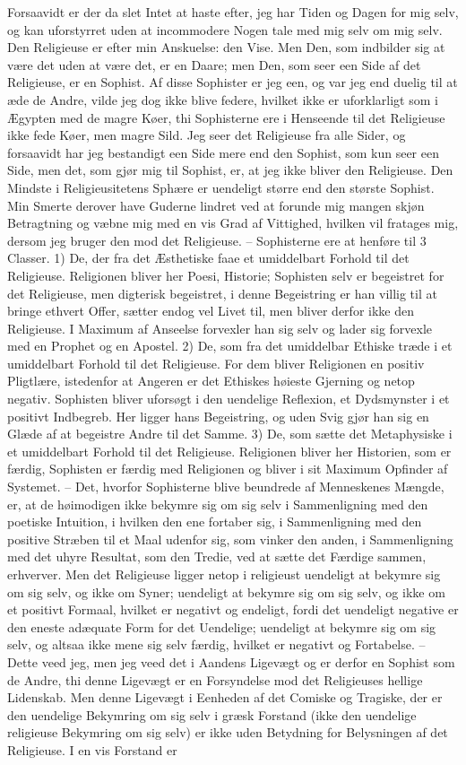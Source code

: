 \documentclass[12pt,a4paper]{article}
\begin{document}
Forsaavidt er der da slet Intet at haste efter, jeg har Tiden og Dagen for mig selv, og kan uforstyrret uden at incommodere Nogen tale med mig selv om mig selv. Den Religieuse er efter min Anskuelse: den Vise. Men Den, som indbilder sig at være det uden at være det, er en Daare; men Den, som seer een Side af det Religieuse, er en Sophist. Af disse Sophister er jeg een, og var jeg end duelig til at æde de Andre, vilde jeg dog ikke blive federe, hvilket ikke er uforklarligt som i Ægypten med de magre Køer, thi Sophisterne ere i Henseende til det Religieuse ikke fede Køer, men magre Sild. Jeg seer det Religieuse fra alle Sider, og forsaavidt har jeg bestandigt een Side mere end den Sophist, som kun seer een Side, men det, som gjør mig til Sophist, er, at jeg ikke bliver den Religieuse. Den Mindste i Religieusitetens Sphære er uendeligt større end den største Sophist. Min Smerte derover have Guderne lindret ved at forunde mig mangen skjøn Betragtning og væbne mig med en vis Grad af Vittighed, hvilken vil fratages mig, dersom jeg bruger den mod det Religieuse. – Sophisterne ere at henføre til 3 Classer. 1) De, der fra det Æsthetiske faae et umiddelbart Forhold til det Religieuse. Religionen bliver her Poesi, Historie; Sophisten selv er begeistret for det Religieuse, men digterisk begeistret, i denne Begeistring er han villig til at bringe ethvert Offer, sætter endog vel Livet til, men bliver derfor ikke den Religieuse. I Maximum af Anseelse forvexler han sig selv og lader sig forvexle med en Prophet og en Apostel. 2) De, som fra det umiddelbar Ethiske træde i et umiddelbart Forhold til det Religieuse. For dem bliver Religionen en positiv Pligtlære, istedenfor at Angeren er det Ethiskes høieste Gjerning og netop negativ. Sophisten bliver uforsøgt i den uendelige Reflexion, et Dydsmynster i et positivt Indbegreb. Her ligger hans Begeistring, og uden Svig gjør han sig en Glæde af at begeistre Andre til det Samme. 3) De, som sætte det Metaphysiske i et umiddelbart Forhold til det Religieuse. Religionen bliver her Historien, som er færdig, Sophisten er færdig med Religionen og bliver i sit Maximum Opfinder af Systemet. – Det, hvorfor Sophisterne blive beundrede af Menneskenes Mængde, er, at de høimodigen ikke bekymre sig om sig selv i Sammenligning med den poetiske Intuition, i hvilken den ene fortaber sig, i Sammenligning med den positive Stræben til et Maal udenfor sig, som vinker den anden, i Sammenligning med det uhyre Resultat, som den Tredie, ved at sætte det Færdige sammen, erhverver. Men det Religieuse ligger netop i religieust uendeligt at bekymre sig om sig selv, og ikke om Syner; uendeligt at bekymre sig om sig selv, og ikke om et positivt Formaal, hvilket er negativt og endeligt, fordi det uendeligt negative er den eneste adæquate Form for det Uendelige; uendeligt at bekymre sig om sig selv, og altsaa ikke mene sig selv færdig, hvilket er negativt og Fortabelse. – Dette veed jeg, men jeg veed det i Aandens Ligevægt og er derfor en Sophist som de Andre, thi denne Ligevægt er en Forsyndelse mod det Religieuses hellige Lidenskab. Men denne Ligevægt i Eenheden af det Comiske og Tragiske, der er den uendelige Bekymring om sig selv i græsk Forstand (ikke den uendelige religieuse Bekymring om sig selv) er ikke uden Betydning for Belysningen af det Religieuse. I en vis Forstand er 
\end{document}

